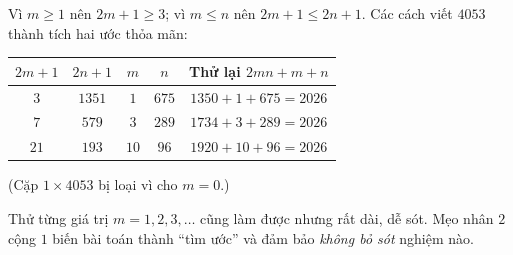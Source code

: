 {
Vì $m\ge1$ nên $2m+1\ge3$; vì $m\le n$ nên $2m+1\le2n+1$. Các cách viết $4053$ thành tích hai ước thỏa mãn:
\begin{center}\begin{tabular}{|c|c|c|c|c|}\hline
$2m+1$ & $2n+1$ & $m$ & $n$ & Thử lại $2mn+m+n$\\\hline
$3$ & $1351$ & $1$ & $675$ & $1350+1+675=2026$\\\hline
$7$ & $579$ & $3$ & $289$ & $1734+3+289=2026$\\\hline
$21$ & $193$ & $10$ & $96$ & $1920+10+96=2026$\\\hline
\end{tabular}\end{center}
(Cặp $1\times4053$ bị loại vì cho $m=0$.)
\begin{warnbox}Thử từng giá trị $m=1,2,3,\dots$ cũng làm được nhưng rất dài, dễ sót. Mẹo nhân $2$ cộng $1$ biến bài toán thành
``tìm ước'' và đảm bảo \emph{không bỏ sót} nghiệm nào.\end{warnbox}
}

